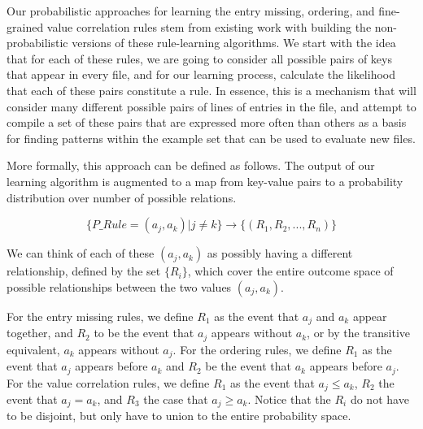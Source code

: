

Our probabilistic approaches for learning the entry missing, 
ordering, and fine-grained value correlation rules stem 
from existing work with building 
the non-probabilistic versions of these rule-learning algorithms. 
We start with the idea that for each of these rules, 
we are going to consider all possible pairs of keys that appear in every 
file, and for our learning process, calculate the likelihood that each of 
these pairs constitute a rule. 
In essence, this is a mechanism that will consider many different possible 
pairs of lines of entries in the file, 
and attempt to compile a set of these pairs 
that are expressed more often than others as a basis for finding patterns 
within the example set that can be used to evaluate new files.

More formally, this approach can be defined as follows. 
The output of our learning algorithm is augmented to a map from 
key-value pairs to a probability distribution over number of possible 
relations.

\[
\{ P\_Rule = (a_j, a_k) | j \neq k \} \rightarrow \{ (R_1, R_2, ... , R_n) \}
\]

We can think of each of these $(a_j, a_k)$ as possibly having a different relationship, defined by the set $\{ R_i \}$, which cover the entire outcome space of possible relationships between the two values $(a_j, a_k)$.

For the entry missing rules, we define $R_1$ as the event that $a_j$ and
$a_k$ appear together, and $R_2$ to be the event that $a_j$ appears
without $a_k$, or by the transitive equivalent, $a_k$ appears without
$a_j$. For the ordering rules, we define $R_1$ as the event that
$a_j$ appears before $a_k$ and $R_2$ be the event that $a_k$ appears
before $a_j$. For the value correlation rules, we define $R_1$ as the
event that $a_j \leq a_k$, $R_2$ the event that $a_j = a_k$, and $R_3$
the case that $a_j \geq a_k$. Notice that the $R_i$ do not have to be
disjoint, but only have to union to the entire probability space.

